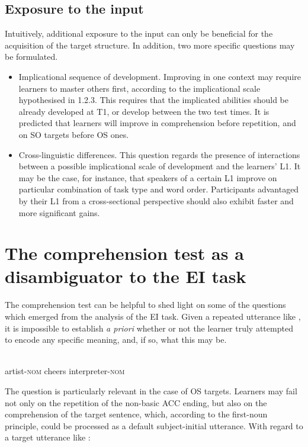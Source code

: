 \subsection{Exposure to the input}\label{sec:06:1.5}

Intuitively, additional exposure to the input can only be beneficial for the acquisition of the target structure. In addition, two more specific questions may be formulated. 

\begin{itemize}
    \item Implicational sequence of development. Improving in one context may require learners to master others first, according to the implicational scale hypothesised in 1.2.3. This requires that the implicated abilities should be already developed at T1, or develop between the two test times. It is predicted that learners will improve in comprehension before repetition, and on SO targets before OS ones.
    \item Cross-linguistic differences. This question regards the presence of interactions between a possible implicational scale of development and the learners' L1. It may be the case, for instance, that speakers of a certain L1 improve on particular combination of task type and word order. Participants advantaged by their L1 from a cross-sectional perspective should also exhibit faster and more significant gains.
\end{itemize}

\section{The comprehension test as a disambiguator to the EI task}\label{sec:06:2}

The comprehension test can be helpful to shed light on some of the questions which emerged from the analysis of the EI task. Given a repeated utterance like , it is impossible to establish \textit{a priori} whether or not the learner truly attempted to encode any specific meaning, and, if so, what this may be. 

\ea%
    \label{ex:06:1}
    \\
            artist-\textsc{nom}  cheers    interpreter-\textsc{nom}\\
    \z

The question is particularly relevant in the case of OS targets. Learners may fail not only on the repetition of the non-basic ACC ending, but also on the comprehension of the target sentence, which, according to the first-noun principle, could be processed as a default subject-initial utterance. With regard to a target utterance like : 

